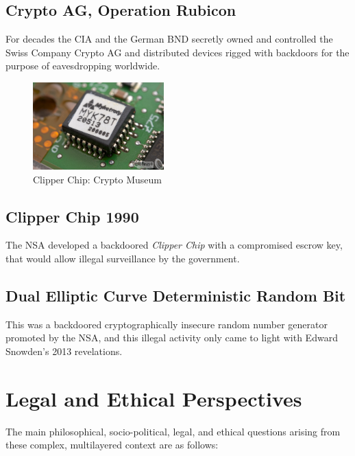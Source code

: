 \documentclass[twoside,twocolumn]{article}
\begin{document}
\subsection*{Crypto AG, Operation Rubicon}
For decades the CIA and the German BND secretly owned and controlled the Swiss Company Crypto AG and distributed devices rigged with backdoors for the purpose of
eavesdropping worldwide\cite{rubicon}.

\begin{figure}
\centering
  \includegraphics[width=0.45\textwidth]{i/clipper.jpg}
  \caption{Clipper Chip: Crypto Museum \cite{clipper}}
\end{figure}



\subsection*{Clipper Chip 1990}
The NSA developed a backdoored \textit{Clipper Chip}
with a compromised escrow key, that would allow illegal surveillance by the government\cite{clipper}.

\subsection*{Dual Elliptic Curve Deterministic Random Bit}
This was a backdoored cryptographically insecure random number generator promoted by the NSA, and
this illegal activity only came to light with Edward Snowden's 2013 revelations\cite{dual}.


\section*{Legal and Ethical Perspectives}
The main philosophical, socio-political, legal, and ethical questions arising from these 
complex, multilayered context are as follows:
\end{document}
